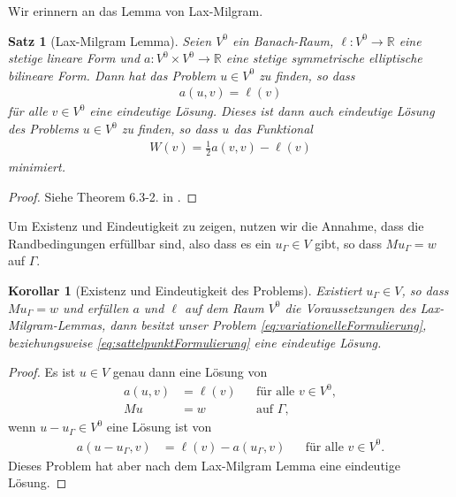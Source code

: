 \documentclass{scrartcl}
\newcounter{everything}
\newtheorem{corollary}[everything]{Korollar}
\newtheorem{theorem}[everything]{Satz}
\def\R{\mathbb{R}}
\begin{document}
Wir erinnern an das Lemma von Lax-Milgram.
\begin{theorem}[Lax-Milgram Lemma]\label{th:LaxMilgramLemma}
	Seien $V^0$ ein Banach-Raum, $\ell\colon V^0\to\R$ eine stetige lineare Form und $a\colon V^0\times V^0\to\R$ eine stetige symmetrische elliptische bilineare Form.
	Dann hat das Problem $u\in V^0$ zu finden, so dass
	\begin{align*}
		a(u,v)=\ell(v)
	\end{align*}
	für alle $v\in V^0$ eine eindeutige Lösung. Dieses ist dann auch eindeutige Lösung des Problems $u\in V^0$ zu finden, so dass $u$ das Funktional
	\begin{align*}
		W(v)=\frac{1}{2}a(v,v)-\ell(v)
	\end{align*}
	minimiert.
\end{theorem}
\begin{proof}
	Siehe Theorem 6.3-2. in \cite[S.288]{Cia-1988}.
\end{proof}

Um Existenz und Eindeutigkeit zu zeigen, nutzen wir die Annahme, dass die Randbedingungen erfüllbar sind, also dass es ein $u_\Gamma\in V$ gibt, so dass $M u_\Gamma=w$ auf $\Gamma$.

\begin{corollary}[Existenz und Eindeutigkeit des Problems]\label{co:ExistenzUndEindeutigkeit}
	Existiert $u_\Gamma\in V$, so dass $Mu_\Gamma=w$ und erfüllen $a$ und $\ell$ auf dem Raum $V^0$ die Voraus\-setzungen des Lax-Milgram-Lemmas, dann besitzt unser Problem \eqref{eq:variationelleFormulierung}, beziehungsweise \eqref{eq:sattelpunktFormulierung} eine eindeutige Lösung.
\end{corollary}
\begin{proof}
	Es ist $u\in V$ genau dann eine Lösung von 
	\begin{align*}
		a(u,v) &= \ell(v) &&\text{für alle }v\in V^0, \\
		Mu &= w &&\text{auf }\Gamma,
	\end{align*}
	wenn $u-u_\Gamma\in V^0$ eine Lösung ist von
	\begin{align*}
		a(u-u_\Gamma,v)&= \ell(v)-a(u_\Gamma,v) &&\text{für alle }v\in V^0.
	\end{align*}
	Dieses Problem hat aber nach dem Lax-Milgram Lemma eine eindeutige Lösung.
\end{proof}
\end{document}
